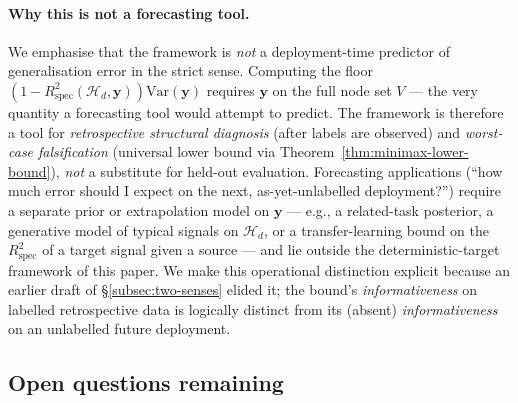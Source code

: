 \documentclass[11pt,a4paper]{article}
\theoremstyle{plain}
\theoremstyle{definition}
\theoremstyle{remark}
\newcommand{\by}{\mathbf{y}}
\newcommand{\Var}{\mathrm{Var}}
\newcommand{\Rspec}{R^2_{\mathrm{spec}}}
\newcommand{\Hcal}{\mathcal{H}}
\begin{document}
\paragraph{Why this is not a forecasting tool.}  We emphasise that
the framework is \emph{not} a deployment-time predictor of
generalisation error in the strict sense. Computing the floor
$(1 - \Rspec(\Hcal_d, \by))\Var(\by)$ requires $\by$ on the full
node set $V$ --- the very quantity a forecasting tool would attempt
to predict. The framework is therefore a tool for
\emph{retrospective structural diagnosis} (after labels are
observed) and \emph{worst-case falsification} (universal lower
bound via Theorem~\ref{thm:minimax-lower-bound}), \emph{not} a
substitute for held-out evaluation. Forecasting applications
(``how much error should I expect on the next, as-yet-unlabelled
deployment?'') require a separate prior or extrapolation model on
$\by$ --- e.g., a related-task posterior, a generative model of
typical signals on $\Hcal_d$, or a transfer-learning bound on the
$\Rspec$ of a target signal given a source --- and lie outside
the deterministic-target framework of this paper. We make this
operational distinction explicit because an earlier draft of
\S\ref{subsec:two-senses} elided it; the bound's
\emph{informativeness} on labelled retrospective data is logically
distinct from its (absent) \emph{informativeness} on an unlabelled
future deployment.

\subsection{Open questions remaining}
\label{subsec:open}
\end{document}
